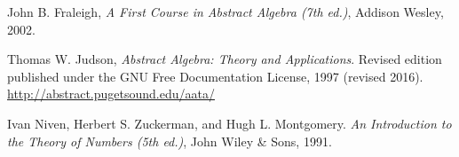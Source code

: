 \documentclass[openany, oneside]{book}
\begin{document}
\begin{thebibliography}{99}

 John B. Fraleigh, \textit{A First Course in Abstract Algebra (7th ed.)}, Addison Wesley, 2002.

 Thomas W. Judson, \textit{Abstract Algebra: Theory and Applications}. Revised edition published under the GNU Free
Documentation License, 1997 (revised 2016). \url{http://abstract.pugetsound.edu/aata/}

 Ivan Niven, Herbert S. Zuckerman, and Hugh L.
Montgomery. \textit{An Introduction to the Theory of Numbers (5th
ed.)}, John Wiley \& Sons, 1991.

\end{thebibliography}
\end{document}
